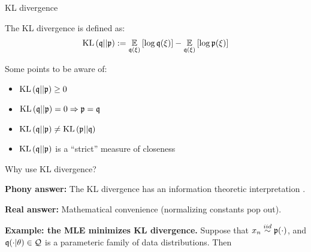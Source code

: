 \begin{frame}{KL divergence}

The KL divergence is defined as:
%
\begin{align*}
%
\kl{\q}{\p} :=
\expect{\q(\xi)}{\log \q(\xi)} - \expect{\q(\xi)}{\log \p(\xi)}
%
\end{align*}
%

Some points to be aware of:
\begin{itemize}
    \item $\mathrm{KL}\left(\mathfrak{q} || \mathfrak{p} \right) \ge 0$
    \item $\mathrm{KL}\left(\mathfrak{q} || \mathfrak{p} \right) = 0 \Rightarrow \mathfrak{p} = \mathfrak{q}$
    \item $\mathrm{KL}\left(\mathfrak{q} || \mathfrak{p} \right) \ne \mathrm{KL}\left(\mathfrak{p} || \mathfrak{q} \right)$
    \item $\mathrm{KL}\left(\mathfrak{q} || \mathfrak{p} \right)$ is a ``strict'' measure of closeness
        \citep{gibbs2002choosing}
\end{itemize}

Why use KL divergence?

\textbf{Phony answer:}
The KL divergence has an information theoretic
interpretation \citep{kullback1951information}.

\textbf{Real answer:}
Mathematical convenience (normalizing constants pop out).

\textbf{Example: the MLE minimizes KL divergence.}  Suppose that
$x_n \overset{iid}{\sim} \mathfrak{p}(\cdot)$, and $\mathfrak{q}(\cdot | \theta) \in \mathcal{Q}$ is a parameteric
family of data distributions.
Then
%
%
%
%
\end{frame}

